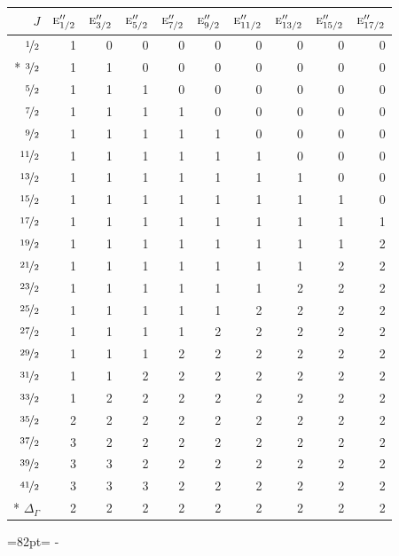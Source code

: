 \documentclass[10pt,a4paper]{article}
\makeatletter
\def\grouprule#1#2{\noalign{\marks\LTgroupmarks{\the\belowrulesep}\nobreak\vskip#1%
  \vskip\aboverulesep}\multispan\LT@cols\unskip{\leaders\hrule\@height#2\hfill\kern\z@}\cr
  \noalign{\penalty\LTrulebreak\vskip\belowrulesep\global\@lastruleclass\z@}}
\newcommand{\needspace}[1]{\par\penalty-100\begingroup\dimen0=#1\relax\dimen2=\pagegoal
  \advance\dimen2-\pagetotal\ifdim\dimen0>\dimen2\relax\ifdim\dimen2>0pt\vfil\break\fi\fi
  \endgroup}
\numberwithin{equation}{section}
\newcommand{\irr}[1]{\text{\normalfont\scshape #1}}
\makeatother
\begin{document}
{\small\begin{longtable}{@{}rrrrrrrrrr@{}}\toprule
$J$ & $\irr{e}_{1/2}''$ & $\irr{e}_{3/2}''$ & $\irr{e}_{5/2}''$ & $\irr{e}_{7/2}''$ & $\irr{e}_{9/2}''$ & $\irr{e}_{11/2}''$ & $\irr{e}_{13/2}''$ & $\irr{e}_{15/2}''$ & $\irr{e}_{17/2}''$\\\midrule\endhead
\bottomrule\endfoot\endlastfoot
$\nicefrac{1}{2}$ & 1 & 0 & 0 & 0 & 0 & 0 & 0 & 0 & 0\\*
$\nicefrac{3}{2}$ & 1 & 1 & 0 & 0 & 0 & 0 & 0 & 0 & 0\\
$\nicefrac{5}{2}$ & 1 & 1 & 1 & 0 & 0 & 0 & 0 & 0 & 0\\
$\nicefrac{7}{2}$ & 1 & 1 & 1 & 1 & 0 & 0 & 0 & 0 & 0\\
$\nicefrac{9}{2}$ & 1 & 1 & 1 & 1 & 1 & 0 & 0 & 0 & 0\\
$\nicefrac{11}{2}$ & 1 & 1 & 1 & 1 & 1 & 1 & 0 & 0 & 0\\
$\nicefrac{13}{2}$ & 1 & 1 & 1 & 1 & 1 & 1 & 1 & 0 & 0\\
$\nicefrac{15}{2}$ & 1 & 1 & 1 & 1 & 1 & 1 & 1 & 1 & 0\\
$\nicefrac{17}{2}$ & 1 & 1 & 1 & 1 & 1 & 1 & 1 & 1 & 1\\
$\nicefrac{19}{2}$ & 1 & 1 & 1 & 1 & 1 & 1 & 1 & 1 & 2\\
$\nicefrac{21}{2}$ & 1 & 1 & 1 & 1 & 1 & 1 & 1 & 2 & 2\\
$\nicefrac{23}{2}$ & 1 & 1 & 1 & 1 & 1 & 1 & 2 & 2 & 2\\
$\nicefrac{25}{2}$ & 1 & 1 & 1 & 1 & 1 & 2 & 2 & 2 & 2\\
$\nicefrac{27}{2}$ & 1 & 1 & 1 & 1 & 2 & 2 & 2 & 2 & 2\\
$\nicefrac{29}{2}$ & 1 & 1 & 1 & 2 & 2 & 2 & 2 & 2 & 2\\
$\nicefrac{31}{2}$ & 1 & 1 & 2 & 2 & 2 & 2 & 2 & 2 & 2\\
$\nicefrac{33}{2}$ & 1 & 2 & 2 & 2 & 2 & 2 & 2 & 2 & 2\\
$\nicefrac{35}{2}$ & 2 & 2 & 2 & 2 & 2 & 2 & 2 & 2 & 2\\
$\nicefrac{37}{2}$ & 3 & 2 & 2 & 2 & 2 & 2 & 2 & 2 & 2\\
$\nicefrac{39}{2}$ & 3 & 3 & 2 & 2 & 2 & 2 & 2 & 2 & 2\\
$\nicefrac{41}{2}$ & 3 & 3 & 3 & 2 & 2 & 2 & 2 & 2 & 2\\*
\grouprule{0pt}{\lightrulewidth} $\Delta_\Gamma$ & 2 & 2 & 2 & 2 & 2 & 2 & 2 & 2 & 2\\
\bottomrule\end{longtable}}
\needspace{82pt}
\end{document}
